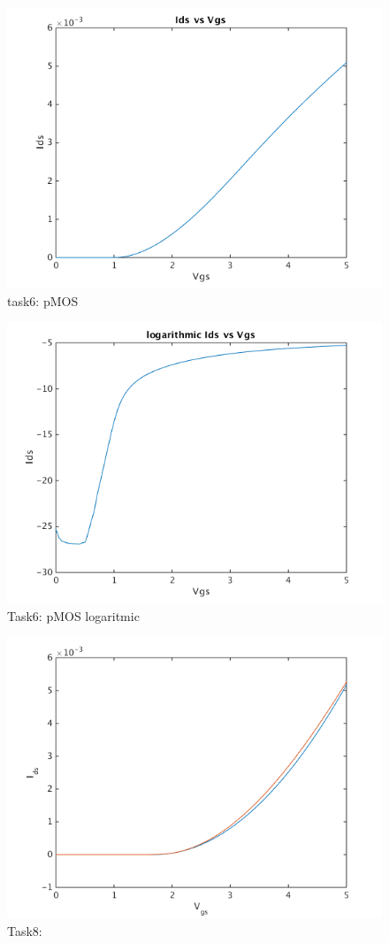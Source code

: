 \documentclass[11pt,a4paper]{report}
\begin{document}
 \begin{figure}[ht!]
\caption{task6: pMOS }
\centering
\includegraphics[scale=1]{task6.png}
\end{figure}
\begin{figure}[ht!]
\caption{Task6: pMOS logaritmic }
\centering
\includegraphics[scale=1]{task6log.png}
\end{figure}
\begin{figure}[ht!]
\caption{Task8: }
\centering
\includegraphics[scale=1]{task8.png}
\end{figure}
\end{document}

